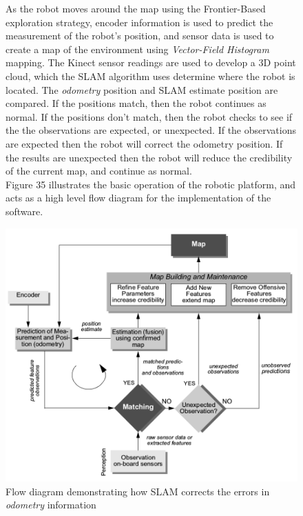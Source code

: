 \documentclass[a4paper]{article}
\begin{document}
\begin{figure}[h]
\begin{minipage}{0.45\textwidth}
As the robot moves around the map using the Frontier-Based exploration strategy, encoder information is used to predict the measurement of the robot's position, and sensor data is used to create a map of the environment using \textit{Vector-Field Histogram} mapping. The Kinect sensor readings are used to develop a 3D point cloud, which the SLAM algorithm uses determine where the robot is located. The \textit{odometry} position and SLAM estimate position are compared. If the positions match, then the robot continues as normal. If the positions don't match, then the robot checks to see if the the observations are expected, or unexpected. If the observations are expected then the robot will correct the odometry position. If the results are unexpected then the robot will reduce the credibility of the current map, and continue as normal.\\

Figure 35 illustrates the basic operation of the robotic platform, and acts as a high level flow diagram for the implementation of the software.
\end{minipage}
\hspace{0.5cm}
\begin{minipage}{0.45\textwidth}
\centering
\includegraphics[scale=0.27]{localisation_SLAM}
\caption{Flow diagram demonstrating how SLAM corrects the errors in \textit{odometry} information}
\end{minipage}

\end{figure}
\end{document}
